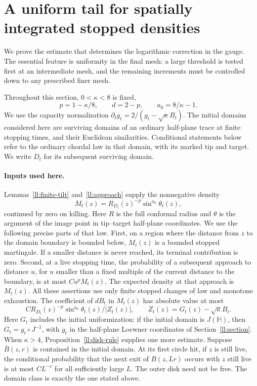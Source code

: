 \documentclass[11pt]{article}
\theoremstyle{definition}
\theoremstyle{remark}
\numberwithin{equation}{section}
\begin{document}
\section{A uniform tail for spatially integrated stopped densities}
\label{mesh:section}

We prove the estimate that determines the logarithmic correction in the
gauge.  The essential feature is uniformity in the final mesh: a large
threshold is tested first at an intermediate mesh, and the remaining
increments must be controlled down to any prescribed finer mesh.

Throughout this section, $0<\kappa<8$ is fixed,
\[
 p=1-\kappa/8,\qquad d=2-p,\qquad a_0=8/\kappa-1.
\]
We use the capacity normalization
$\partial_tg_t=2/(g_t-\sqrt\kappa B_t)$.  The initial domains considered
here are surviving domains of an ordinary half-plane trace at finite
stopping times, and their Euclidean similarities.  Conditional statements below refer
to the ordinary chordal law in that domain, with its marked tip and
target.  We write $D_t$ for its subsequent surviving domain.

\paragraph{Inputs used here.}
Lemmas~\ref{ll:finite-tilt} and~\ref{ll:approach} supply the nonnegative density
\[
 M_t(z)=R_{D_t}(z)^{-p}\sin^{a_0}\theta_t(z),
\]
continued by zero on killing.  Here $R$ is the full conformal radius and
$\theta$ is the argument of the image point in tip--target half-plane
coordinates.  We use the following precise parts of that law.
First, on a region where the distance from $z$ to the domain boundary is
bounded below, $M_t(z)$ is a bounded stopped martingale.  If a smaller
distance is never reached, its terminal contribution is zero.  Second,
at a live stopping time, the probability of a subsequent approach to
distance $u$, for $u$ smaller than a fixed multiple of the current
distance to the boundary, is at most $C u^pM_t(z)$.  The expected density
at that approach is $M_t(z)$.  All these assertions use only finite
stopped changes of law and monotone exhaustion.  The coefficient of
$dB_t$ in $M_t(z)$ has absolute value at most
\begin{equation}
 C R_{D_t}(z)^{-p}\sin^{a_0}\theta_t(z)/|Z_t(z)|,
 \qquad Z_t(z)=G_t(z)-\sqrt\kappa B_t.
 \label{mesh:coefficient-input}
\end{equation}
Here $G_t$ includes the initial uniformization: if the initial domain
is $J(\mathbb H)$, then $G_t=g_t\circ J^{-1}$, with $g_t$ in the
half-plane Loewner coordinates of Section~\ref{ll:section}.
When $\kappa>4$, Proposition~\ref{ll:disk-rule} supplies one more
estimate.  Suppose $\overline B(z,r)$ is contained in the initial
domain.  At its first circle hit, if $z$ is still live, the conditional
probability that the next exit of $B(z,Lr)$ occurs with $z$ still live
is at most $CL^{-c}$ for all sufficiently large $L$.  The outer disk need
not be free.  The domain class is exactly the one stated above.
\end{document}
